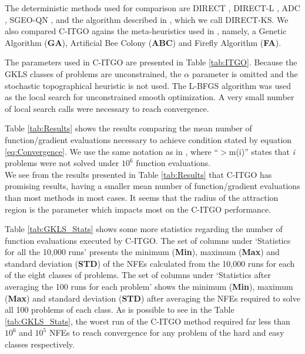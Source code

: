 The deterministic methods used for comparison are DIRECT \cite{DIRECT}, DIRECT-L \cite{DIRECTL}, ADC \cite{ADC}, SGEO-QN \cite{SGEO}, and the algorithm described in \cite{ADC2}, which we call DIRECT-KS. We also compared C-ITGO agains the meta-heuristics used in \cite{NAT}, namely, a Genetic Algorithm (\textbf{GA}), Artificial Bee Colony (\textbf{ABC}) and Firefly Algorithm (\textbf{FA}).

The parameters used in C-ITGO are presented in Table \ref{tab:ITGO}. Because the GKLS classes of problems are unconstrained, the $\alpha$ parameter is omitted and the stochastic topographical heuristic is not used. The L-BFGS algorithm was used as the local search for unconstrained smooth optimization. A very small number of local search calls were necessary to reach convergence.



Table \ref{tab:Results} shows the results comparing the mean number of function/gradient evaluations necessary to achieve condition stated by equation \ref{eq:Convergence}. We use the same notation as in \cite{NAT}, where “$>$m(i)” states that \textit{i} problems were not solved under $10^6$ function evaluations.\\




We see from the results presented in Table \ref{tab:Results} that C-ITGO has promising results, having a smaller mean number of function/gradient evaluations than most methods in most cases. It seems that the radius of the attraction region is the parameter which impacts most on the C-ITGO performance. 

Table \ref{tab:GKLS_Stats} shows some more statistics regarding the number of function evaluations executed by C-ITGO. The set of columns under `Statistics for all the 10,000 runs' presents the minimum (\textbf{Min}), maximum (\textbf{Max}) and standard deviation (\textbf{STD}) of the NFEs calculated from the 10,000 runs for each of the eight classes of problems. The set of columns under `Statistics after averaging the 100 runs for each problem' shows the minimum (\textbf{Min}), maximum (\textbf{Max}) and standard deviation (\textbf{STD}) after averaging the NFEs required to solve all 100 problems of each class. As is possible to see in the Table \ref{tab:GKLS_Stats}, the worst run of the C-ITGO method required far less than $10^6$ and $10^5$ NFEs to reach convergence for any problem of the hard and easy classes respectively.

